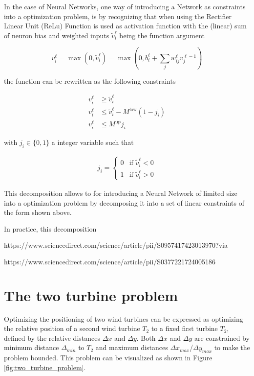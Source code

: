 In the case of Neural Networks, one way of introducing a Network as constraints into a optimization problem, is by recognizing that when using the Rectifier Linear Unit (ReLu) Function is used as activation function with the (linear) sum of neuron bias and weighted inputs $\tilde{v}_i^\ell$ being the function argument


\begin{equation}
	v_i^\ell = \max(0, \tilde{v}_i^\ell) = \max(0,  b_i^\ell + \sum_j w_{ij}^\ell v_j^{\ell - 1})
\end{equation}


the function can be rewritten as the following constraints 

\begin{align}
	v_i^\ell &\geq \tilde{v}_i^\ell \\
	v_i^\ell &\leq \tilde{v}_i^\ell - M^{\text{low}}(1 - j_i) \\
	v_i^\ell &\leq M^{\text{up}} j_i
\end{align}

with $j_i \in \{0,1\}$ a integer variable such that

\begin{align}
	j_i =
	\begin{cases}
		0 & \text{if } \tilde{v}_i^\ell < 0 \\
		1 & \text{if } \tilde{v}_i^\ell > 0
	\end{cases}
\end{align}

This decomposition allows to for introducing a Neural Network of limited size into a optimization problem by decomposing it into a set of linear constraints of the form shown above. \cite{ALCANTARA2023120895}

In practice, this decomposition 


https://www.sciencedirect.com/science/article/pii/S0957417423013970?via%

https://www.sciencedirect.com/science/article/pii/S0377221724005186


\section{The two turbine problem}

Optimizing the positioning of two wind turbines can be expressed as optimizing the relative position of a second wind turbine $T_2$ to a fixed first turbine $T_2$, defined by the relative distances $\Delta x$ and  $\Delta y$. Both  $\Delta x$ and  $\Delta y$ are constrained by minimum distance $\Delta_{min}$ to  $T_2$ and maximum distances $\Delta x_{max}$/$\Delta y_{max}$ to make the problem bounded. 
This problem can be visualized as shown in Figure \ref{fig:two_turbine_problem}.


